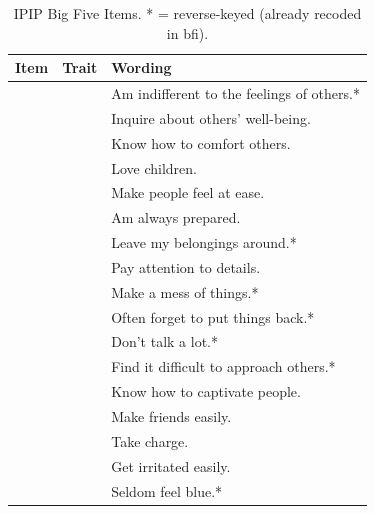 \documentclass[
]{article}
\begin{document}
\begin{table}
\centering
\caption{\label{tab:item-table}IPIP Big Five Items. * = reverse-keyed (already recoded in bfi).}
\centering
\begin{tabu} to 
\hline
Item & Trait & Wording\\
\hline
{} &  & Am indifferent to the feelings of others.*\\
 &  & Inquire about others' well-being.\\
 &  & Know how to comfort others.\\
 &  & Love children.\\
 &  & Make people feel at ease.\\
 &  & Am always prepared.\\
 &  & Leave my belongings around.*\\
 &  & Pay attention to details.\\
 &  & Make a mess of things.*\\
 &  & Often forget to put things back.*\\
 &  & Don't talk a lot.*\\
 &  & Find it difficult to approach others.*\\
 &  & Know how to captivate people.\\
 &  & Make friends easily.\\
 &  & Take charge.\\
 &  & Get irritated easily.\\
 &  & Seldom feel blue.*\\

\end{tabu}
\end{table}
\end{document}

